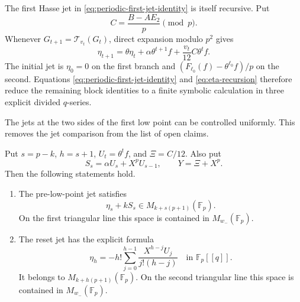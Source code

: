 The first Hasse jet in \eqref{eq:periodic-first-jet-identity} is itself
recursive.  Put
\[
 C=\frac{B-AE_2}{p}\pmod p.
\]
Whenever $G_{t+1}=\mathcal T_{v_t}(G_t)$, direct expansion modulo $p^2$
gives
\begin{equation}\label{eq:eta-recursion}
 \eta_{t+1}
 =\theta\eta_t+\alpha\theta^{t+1}f
   +\frac{v_t}{12}C\theta^tf.
\end{equation}
The initial jet is $\eta_0=0$ on the first branch and
$(F_{\ell_0}(f)-\theta^{\ell_0}f)/p$ on the second.  Equations
\eqref{eq:periodic-first-jet-identity} and \eqref{eq:eta-recursion}
therefore reduce the remaining block identities to a finite symbolic
calculation in three explicit divided $q$-series.

The jets at the two sides of the first low point can be controlled
uniformly.  This removes the jet comparison from the list of open claims.

\begin{proposition}
\label{prop:low-point-jets-low}
Put $s=p-k$, $h=s+1$, $U_t=\theta^tf$, and
$\Xi=C/12$.  Also put
\[
 S_s=\alpha U_s+X^pU_{s-1},
 \qquad Y=\Xi+X^p.
\]
Then the following statements hold.
\begin{enumerate}
\item The pre-low-point jet satisfies
\begin{equation}
\label{eq:pre-low-jet-modular}
 \eta_s+kS_s\in M_{k+s(p+1)}(\mathbb F_p).
\end{equation}
On the first triangular line this space is contained in
$M_{w_-}(\mathbb F_p)$.
\item The reset jet has the explicit formula
\begin{equation}
\label{eq:reset-jet-closed-form}
 \eta_h=-h!\sum_{j=0}^{h-1}
 \frac{X^{h-j}U_j}{j!(h-j)}
 \quad\text{in }\mathbb F_p[[q]].
\end{equation}
It belongs to $M_{k+h(p+1)}(\mathbb F_p)$.  On the second triangular
line this space is contained in $M_{w_-}(\mathbb F_p)$.
\end{enumerate}
\end{proposition}

